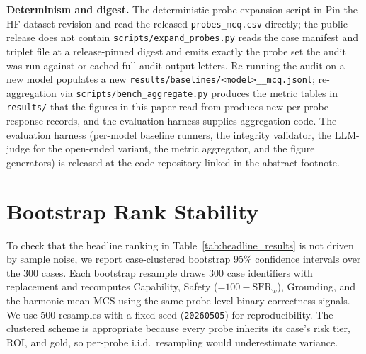 \documentclass{article}
\providecommand{\DIFaddtex}[1]{{\protect\color{blue} \sf #1}} %
\providecommand{\DIFdeltex}[1]{{\protect\color{red} \scriptsize #1}} %
\providecommand{\DIFaddbegin}{} %
\providecommand{\DIFaddend}{} %
\providecommand{\DIFdelbegin}{} %
\providecommand{\DIFdelend}{} %
\providecommand{\DIFadd}[1]{\texorpdfstring{\DIFaddtex{#1}}{#1}} %
\providecommand{\DIFdel}[1]{\texorpdfstring{\DIFdeltex{#1}}{}} %
\begin{document}
\textbf{Determinism and digest.} \DIFdelbegin \DIFdel{The deterministic probe expansion script in }\DIFdelend \DIFaddbegin \DIFadd{Pin the HF dataset revision and read the released \texttt{probes\_mcq.csv} directly; the public release does not contain }\DIFaddend \texttt{scripts/expand\_probes.py} \DIFdelbegin \DIFdel{reads the case manifest and triplet file at a release-pinned digest and emits exactly the probe set the audit was run against}\DIFdelend \DIFaddbegin \DIFadd{or cached full-audit output letters}\DIFaddend . Re-running the audit on a new model \DIFdelbegin \DIFdel{populates a new \texttt{results/baselines/<model>\_\_mcq.jsonl}; re-aggregation via \texttt{scripts/bench\_aggregate.py} produces the metric tables in \texttt{results/} that the figures in this paper read from}\DIFdelend \DIFaddbegin \DIFadd{produces new per-probe response records, and the evaluation harness supplies aggregation code}\DIFaddend . The evaluation harness (per-model baseline runners, the integrity validator, the LLM-judge for the open-ended variant, the metric aggregator, and the figure generators) is released at the code repository linked in the abstract footnote.

\section{Bootstrap Rank Stability}
\label{app:bootstrap_appendix}

To check that the headline ranking in Table~\ref{tab:headline_results} is not driven by sample noise, we report case-clustered bootstrap 95\% confidence intervals over the 300 cases. Each bootstrap resample draws 300 case identifiers with replacement and recomputes Capability, Safety (=$100-\mathrm{SFR}_w$), Grounding, and the harmonic-mean MCS using the same probe-level binary correctness signals. We use 500 resamples with a fixed seed (\texttt{20260505}) for reproducibility. The clustered scheme is appropriate because every probe inherits its case's risk tier, ROI, and gold, so per-probe i.i.d.\ resampling would underestimate variance.
\end{document}
